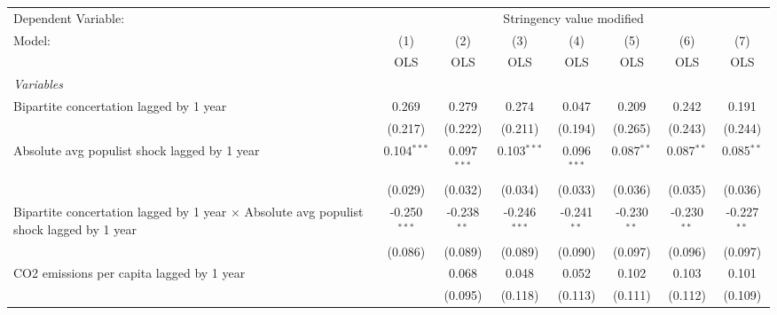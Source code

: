 
\begingroup
\centering
\begin{tabular}{lccccccc}
   \toprule
   Dependent Variable: & \multicolumn{7}{c}{Stringency value modified}\\
   Model:                                                                                         & (1)            & (2)           & (3)            & (4)           & (5)           & (6)           & (7)\\  
                                                                                                  &  OLS           & OLS           & OLS            & OLS           & OLS           & OLS           & OLS\\  
   \midrule
   \emph{Variables}\\
   Bipartite concertation lagged by 1 year                                                        & 0.269          & 0.279         & 0.274          & 0.047         & 0.209         & 0.242         & 0.191\\   
                                                                                                  & (0.217)        & (0.222)       & (0.211)        & (0.194)       & (0.265)       & (0.243)       & (0.244)\\   
   Absolute avg populist shock lagged by 1 year                                                   & 0.104$^{***}$  & 0.097$^{***}$ & 0.103$^{***}$  & 0.096$^{***}$ & 0.087$^{**}$  & 0.087$^{**}$  & 0.085$^{**}$\\   
                                                                                                  & (0.029)        & (0.032)       & (0.034)        & (0.033)       & (0.036)       & (0.035)       & (0.036)\\   
   Bipartite concertation lagged by 1 year $\times$ Absolute avg populist shock lagged by 1 year  & -0.250$^{***}$ & -0.238$^{**}$ & -0.246$^{***}$ & -0.241$^{**}$ & -0.230$^{**}$ & -0.230$^{**}$ & -0.227$^{**}$\\   
                                                                                                  & (0.086)        & (0.089)       & (0.089)        & (0.090)       & (0.097)       & (0.096)       & (0.097)\\   
   CO2 emissions per capita lagged by 1 year                                                      &                & 0.068         & 0.048          & 0.052         & 0.102         & 0.103         & 0.101\\   
                                                                                                  &                & (0.095)       & (0.118)        & (0.113)       & (0.111)       & (0.112)       & (0.109)\\   

\end{tabular}
